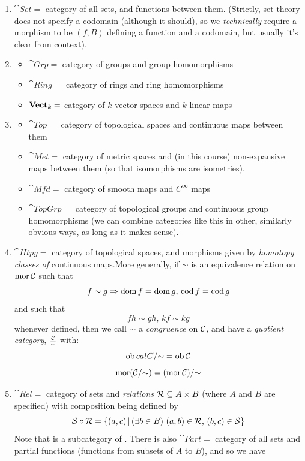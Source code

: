 \documentclass{article}
\begin{document}
\exs \hspace{0.1cm}
\begin{enumerate}
    \item[(a)] $\cat{Set} = $ category of all sets, and functions between them. (Strictly, set theory does not specify a codomain (although it should), so we \textit{technically} require a morphism to be $(f,B)$ defining a function and a codomain, but usually it's clear from context).
    \item[(b)] \begin{itemize}
        \item $\cat{Grp} = $ category of groups and group homomorphisms
        \item $\cat{Ring} = $ category of rings and ring homomorphisms
        \item $\textbf{Vect$_{k}$} = $ category of $k$-vector-spaces and $k$-linear maps
    \end{itemize}
    \item[(c)] \begin{itemize}
        \item $\cat{Top} = $ category of topological spaces and continuous maps between them
        \item $\cat{Met} = $ category of metric spaces and (in this course) non-expansive maps between them (so that isomorphisms are isometries).
        \item $\cat{Mfd} = $ category of smooth maps and $C^{\infty}$ maps
        \item $\cat{TopGrp} = $ category of topological groups and continuous group homomorphisms (we can combine categories like this in other, similarly obvious ways, as long as it makes sense).
    \end{itemize}
    \item[(d)] $\cat{Htpy} = $ category of topological spaces, and morphisms given by \textit{homotopy classes of} continuous maps.\gap More generally, if $\sim$ is an equivalence relation on $\operatorname{mor} \mathcal{C}$ such that \[ f \sim g \Rightarrow \operatorname{dom} f = \operatorname{dom} g, \, \operatorname{cod} f = \operatorname{cod} g \] and such that \[ fh \sim gh, \, kf \sim kg \] whenever defined, then we call $\sim$ a \textit{congruence} on $\mathcal{C}$, and have a \textit{quotient category}, $\frac{\mathcal{C}}{\sim}$ with: \[
    \operatorname{ob} \\calC/{\sim} = \operatorname{ob} \mathcal{C}
    \]
    \[ \operatorname{mor} (\mathcal{C}/{\sim}) = (\operatorname{mor} \mathcal{C})/{\sim} \]
    \item[(e)] $\cat{Rel} = $ category of sets and \textit{relations} $\mathcal{R} \subseteq A \times B$ (where $A$ and $B$ are specified) with composition being defined by \[ \mathcal{S} \circ \mathcal{R} = \{ (a,c) \, | \, (\exists b \in B) \, \, (a,b) \in \mathcal{R}, \, (b,c) \in \mathcal{S} \} \] Note that  is a subcategory of . There is also $\cat{Part} = $ category of all sets and partial functions (functions from subsets of $A$ to $B$), and so we have \[
\]
\end{enumerate}
\end{document}
